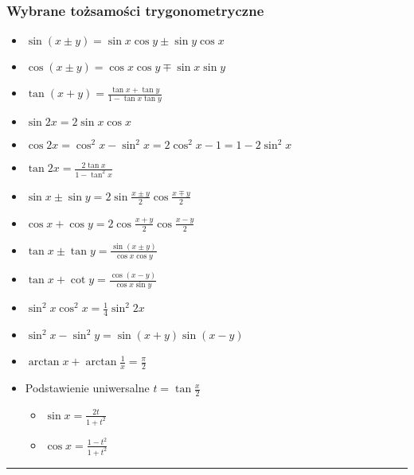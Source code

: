 \documentclass[../main.tex]{subfiles}
\begin{document}
\subsubsection*{Wybrane tożsamości trygonometryczne}
\begin{itemize}
    \item \(\sin(x\pm y)=\sin x\cos y\pm\sin y\cos x\)
    \item \(\cos(x\pm y)=\cos x\cos y\mp\sin x\sin y\)
    \item \(\tan(x+y)=\frac{\tan x+\tan y}{1-\tan x\tan y}\)
    \item \(\sin 2x=2\sin x\cos x\)
    \item \(\cos 2x=\cos^2x-\sin^2x=2\cos^2x-1=1-2\sin^2x\)
    \item \(\tan 2x=\frac{2\tan x}{1-\tan^2 x}\)
    \item \(\sin x\pm\sin y=2\sin\frac{x\pm y}{2}\cos\frac{x\mp y}{2}\)
    \item \(\cos x+\cos y=2\cos\frac{x+y}{2}\cos\frac{x-y}{2}\)
    \item \(\tan x\pm\tan y=\frac{\sin(x\pm y)}{\cos x\cos y}\)
    \item \(\tan x+\cot y=\frac{\cos(x-y)}{\cos x\sin y}\)
    \item \(\sin^2x\cos^2x=\frac{1}{4}\sin^2 2x\)
    \item \(\sin^2x-\sin^2y=\sin(x+y)\sin(x-y)\)
    \item \(\arctan x+\arctan\frac{1}{x}=\frac{\pi}{2}\)
    \item Podstawienie uniwersalne \(t=\tan\frac{x}{2}\)
    \begin{itemize}
        \item \(\sin x=\frac{2t}{1+t^2}\)
        \item \(\cos x=\frac{1-t^2}{1+t^2}\)
    \end{itemize}
\end{itemize}
\noindent\rule{\textwidth}{.5pt}
\end{document}
